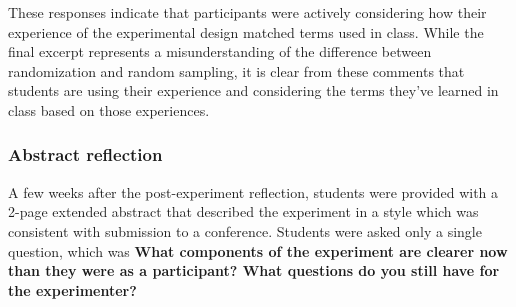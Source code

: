 \documentclass[runningheads
]{llncs}
\begin{document}
These responses indicate that participants were actively considering how
their experience of the experimental design matched terms used in class.
While the final excerpt represents a misunderstanding of the difference
between randomization and random sampling, it is clear from these
comments that students are using their experience and considering the
terms they've learned in class based on those experiences.

\subsubsection{Abstract reflection}\label{abstract-reflection}

A few weeks after the post-experiment reflection, students were provided
with a 2-page extended abstract that described the experiment in a style
which was consistent with submission to a conference. Students were
asked only a single question, which was \textbf{What components of the
experiment are clearer now than they were as a participant? What
questions do you still have for the experimenter?}
\end{document}
